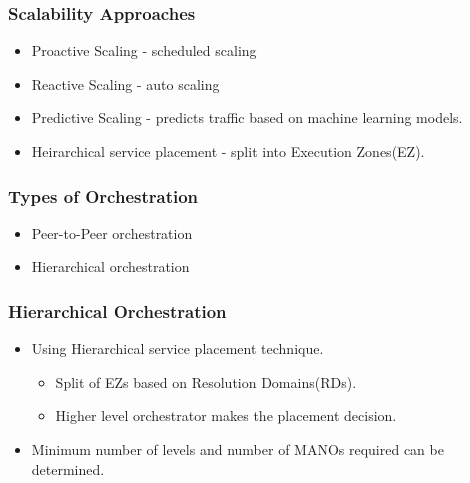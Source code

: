\begin{frame}
\frametitle{Scalability Approaches}

\begin{itemize}
	
	\item Proactive Scaling - scheduled scaling
	\item Reactive Scaling - auto scaling
	\item Predictive Scaling - predicts traffic based on machine learning models.
	\item Heirarchical service placement - split into Execution Zones(EZ).
\end{itemize}   
\end{frame}

\begin{frame}
\frametitle{Types of Orchestration}

\begin{itemize}
\item Peer-to-Peer orchestration
\item Hierarchical orchestration
\end{itemize}

\end{frame}

\begin{frame}
\frametitle{Hierarchical Orchestration}
\begin{itemize}
	
	
	\item Using Hierarchical service placement technique.
	\
	\begin{itemize}
		\item Split  of EZs based on Resolution Domains(RDs).
		\item Higher level orchestrator makes the placement decision.
	\end{itemize}
	\item Minimum number of levels and number of MANOs required can be determined.
\end{itemize}
\end{frame}

